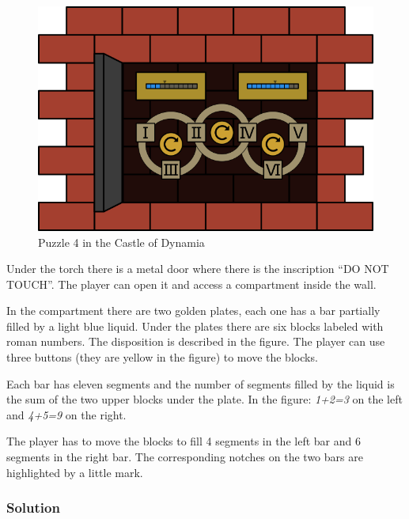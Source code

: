 \begin{figure}[H]
  \centering
  \includegraphics[width=\textwidth]{Images/Puzzles/castleOfDynamia4}
  \caption{Puzzle 4 in the Castle of Dynamia}
\end{figure}


Under the torch there is a metal door where there is the inscription \enquote{DO NOT TOUCH}. The player can open it and access a compartment inside the wall.

In the compartment there are two golden plates, each one has a bar partially filled by a light blue liquid. Under the plates there are six blocks labeled with roman numbers. The disposition is described in the figure. The player can use three buttons (they are yellow in the figure) to move the blocks.

Each bar has eleven segments and the number of segments filled by the liquid is the sum of the two upper blocks under the plate. In the figure: \textit{1+2=3} on the left and \textit{4+5=9} on the right.

The player has to move the blocks to fill 4 segments in the left bar and 6 segments in the right bar. The corresponding notches on the two bars are highlighted by a little mark.

\subsubsection*{Solution}

